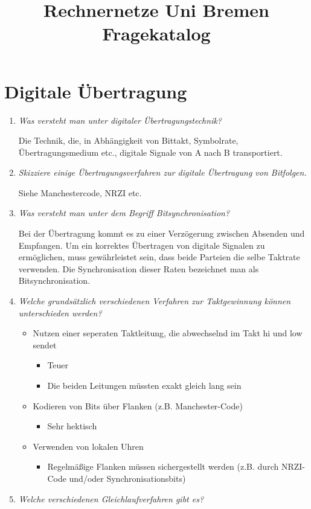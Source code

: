 \documentclass[hidelinks]{article}
\title{Rechnernetze Uni Bremen Fragekatalog}
\begin{document}
\maketitle
\section{Digitale Übertragung}
\begin{enumerate}
\item \textit{Was versteht man unter digitaler Übertragungstechnik?}

Die Technik, die, in Abhängigkeit von Bittakt, Symbolrate, Übertragungsmedium etc., digitale Signale von A nach B transportiert. %

\item \textit{Skizziere einige Übertragungsverfahren zur digitale Übertragung von Bitfolgen.}

Siehe Manchestercode, NRZI etc. %
\item \textit{Was versteht man unter dem Begriff Bitsynchronisation?}

Bei der Übertragung kommt es zu einer Verzögerung zwischen Absenden und Empfangen. Um ein korrektes Übertragen von digitale Signalen zu ermöglichen, muss gewährleistet sein, dass beide Parteien die selbe Taktrate verwenden. Die Synchronisation dieser Raten bezeichnet man als Bitsynchronisation.
\item \textit{Welche grundsätzlich verschiedenen Verfahren zur Taktgewinnung können unterschieden werden?}

\begin{itemize}
	\item Nutzen einer seperaten Taktleitung, die abwechselnd im Takt hi und low sendet 
	\begin{itemize}
		\item Teuer
		\item Die beiden Leitungen müssten exakt gleich lang sein
	\end{itemize}
	\item Kodieren von Bits über Flanken (z.B. Manchester-Code)
	\begin{itemize}
		\item Sehr hektisch
	\end{itemize}
	\item Verwenden von lokalen Uhren
	\begin{itemize}
		\item Regelmäßige Flanken müssen sichergestellt werden (z.B. durch NRZI-Code und/oder Synchronisationsbits)
	\end{itemize}
\end{itemize}
\item \textit{Welche verschiedenen Gleichlaufverfahren gibt es?}


\end{enumerate}
\end{document}

